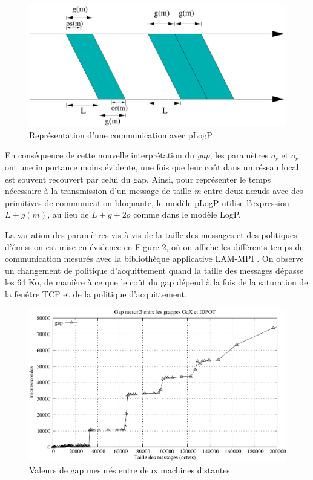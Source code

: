 %
\begin{figure}[h]
\centering
\includegraphics[width=0.7\linewidth]{images/p2p/plogp-struct}

\caption{\label{Figure: pLogP}Représentation d'une communication avec pLogP}

\end{figure}


En conséquence de cette nouvelle interprétation du \emph{gap}, les
paramètres $o_{s}$ et $o_{r}$ ont une importance moins évidente,
une fois que leur coût dans un réseau local est souvent recouvert
par celui du gap.  Ainsi, pour représenter le temps nécessaire à la transmission d'un
message de taille \emph{m} entre deux n{\oe}uds avec des primitives de
communication bloquante, le modèle pLogP utilise l'expression $L+g(m)$,
au lieu de $L+g+2o$ comme dans le modèle LogP. 


La variation des paramètres vis-à-vis de la taille des messages et des politiques d'émission est mise en évidence en Figure \ref{Figure: logp x hockney}, où on affiche les différents temps de communication mesurés avec la bibliothèque applicative LAM-MPI \cite{LAM04}. On observe un
changement de politique d'acquittement quand la taille des messages dépasse les 64 Ko, de manière à ce que le coût du gap dépend à la fois
de la saturation de la fenêtre TCP et de la politique d'acquittement.

%
\begin{figure}
\centering
\includegraphics[width=0.7\linewidth]{images/p2p/hockney-logp1}

\caption{\label{Figure: logp x hockney}Valeurs de gap mesurés entre deux machines
distantes}

\end{figure}



